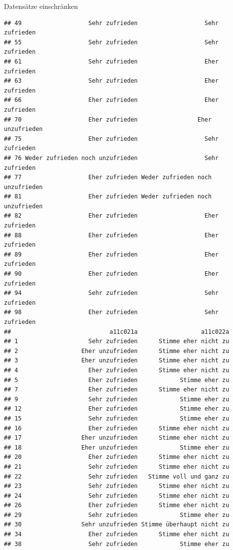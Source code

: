 \documentclass[ignorenonframetext,]{beamer}
\begin{document}
\begin{frame}[fragile]{Datensätze einschränken}
\begin{verbatim}
## 49                   Sehr zufrieden                   Sehr zufrieden
## 55                   Sehr zufrieden                   Sehr zufrieden
## 61                   Sehr zufrieden                   Eher zufrieden
## 63                   Sehr zufrieden                   Eher zufrieden
## 66                   Eher zufrieden                   Eher zufrieden
## 70                   Eher zufrieden                 Eher unzufrieden
## 75                   Eher zufrieden                   Sehr zufrieden
## 76 Weder zufrieden noch unzufrieden                   Sehr zufrieden
## 77                   Eher zufrieden Weder zufrieden noch unzufrieden
## 81                   Eher zufrieden Weder zufrieden noch unzufrieden
## 82                   Eher zufrieden                   Eher zufrieden
## 88                   Eher zufrieden                   Eher zufrieden
## 89                   Eher zufrieden                   Eher zufrieden
## 90                   Eher zufrieden                   Eher zufrieden
## 94                   Sehr zufrieden                   Sehr zufrieden
## 98                   Eher zufrieden                   Sehr zufrieden
##                            a11c021a                  a11c022a
## 1                    Sehr zufrieden      Stimme eher nicht zu
## 2                  Eher unzufrieden      Stimme eher nicht zu
## 3                  Eher unzufrieden      Stimme eher nicht zu
## 4                    Eher zufrieden      Stimme eher nicht zu
## 5                    Eher zufrieden            Stimme eher zu
## 7                    Eher zufrieden      Stimme eher nicht zu
## 9                    Sehr zufrieden            Stimme eher zu
## 12                   Eher zufrieden            Stimme eher zu
## 15                   Sehr zufrieden            Stimme eher zu
## 16                   Eher zufrieden      Stimme eher nicht zu
## 17                 Eher unzufrieden      Stimme eher nicht zu
## 18                 Eher unzufrieden            Stimme eher zu
## 20                   Eher zufrieden      Stimme eher nicht zu
## 21                   Sehr zufrieden      Stimme eher nicht zu
## 22                   Sehr zufrieden   Stimme voll und ganz zu
## 23                   Sehr zufrieden      Stimme eher nicht zu
## 24                   Sehr zufrieden      Stimme eher nicht zu
## 26                   Eher zufrieden      Stimme eher nicht zu
## 29                   Sehr zufrieden            Stimme eher zu
## 30                 Sehr unzufrieden Stimme überhaupt nicht zu
## 34                   Eher zufrieden      Stimme eher nicht zu
## 38                   Sehr zufrieden            Stimme eher zu

\end{verbatim}
\end{frame}
\end{document}

